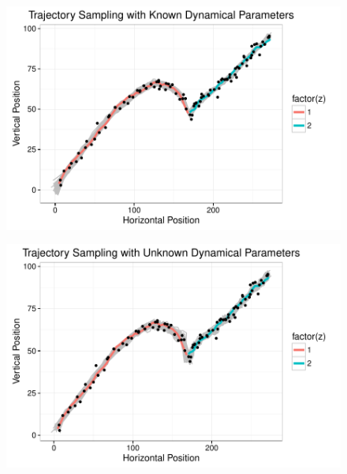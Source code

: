 \documentclass{beamer}
\begin{document}
\begin{frame}
\begin{figure}
  \centering
  \includegraphics[width = 1\linewidth]{"./plot/lds/01_projectile_known"}
\end{figure}
\end{frame}

\begin{frame}
\begin{figure}
  \centering
  \includegraphics[width = 1\linewidth]{"./plot/lds/02_projectile_unknown"}
\end{figure}
\end{frame}
\end{document}
